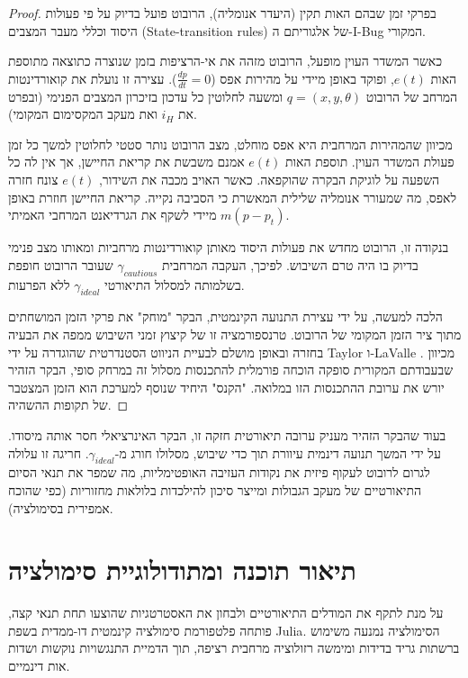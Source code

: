 \documentclass[12pt, a4paper]{article}
\begin{document}
\begin{proof}
בפרקי זמן שבהם האות תקין (היעדר אנומליה), הרובוט פועל בדיוק על פי פעולות היסוד וכללי מעבר המצבים (\textenglish{State-transition rules}) של אלגוריתם ה-\textenglish{I-Bug} המקורי.

כאשר המשדר העוין מופעל, הרובוט מזהה את אי-הרציפות בזמן שנוצרה כתוצאה מתוספת האות $e(t)$, ופוקד באופן מיידי על מהירות אפס ($\frac{dp}{dt} = 0$). עצירה זו נועלת את קואורדינטות המרחב של הרובוט $q = (x, y, \theta)$ ומשעה לחלוטין כל עדכון בזיכרון המצבים הפנימי (ובפרט את $i_H$ ואת מעקב המקסימום המקומי).

מכיוון שהמהירות המרחבית היא אפס מוחלט, מצב הרובוט נותר סטטי לחלוטין למשך כל זמן פעולת המשדר העוין. תוספת האות $e(t)$ אמנם משבשת את קריאת החיישן, אך אין לה כל השפעה על לוגיקת הבקרה שהוקפאה. כאשר האויב מכבה את השידור, $e(t)$ צונח חזרה לאפס, מה שמעורר אנומליה שלילית המאשרת כי הסביבה נקייה. קריאת החיישן חוזרת באופן מיידי לשקף את הגרדיאנט המרחבי האמיתי $m(p - p_t)$.

בנקודה זו, הרובוט מחדש את פעולות היסוד מאותן קואורדינטות מרחביות ומאותו מצב פנימי בדיוק בו היה טרם השיבוש. לפיכך, העקבה המרחבית $\gamma_{cautious}$ שעובר הרובוט חופפת בשלמותה למסלול התיאורטי $\gamma_{ideal}$ ללא הפרעות. 

הלכה למעשה, על ידי עצירת התנועה הקינמטית, הבקר "מוחק" את פרקי הזמן המושחתים מתוך ציר הזמן המקומי של הרובוט. טרנספורמציה זו של קיצוץ זמני השיבוש ממפה את הבעיה בחזרה ובאופן מושלם לבעיית הניווט הסטנדרטית שהוגדרה על ידי \textenglish{Taylor} ו-\textenglish{LaValle} \cite{taylor2014intensity}. מכיוון שבעבודתם המקורית סופקה הוכחה פורמלית להתכנסות מסלול זה במרחק סופי, הבקר הזהיר יורש את ערובת ההתכנסות הזו במלואה. "הקנס" היחיד שנוסף למערכת הוא הזמן המצטבר של תקופות ההשהיה.
\end{proof}

בעוד שהבקר הזהיר מעניק ערובה תיאורטית חזקה זו, הבקר האינרציאלי חסר אותה מיסודו. על ידי המשך תנועה דינמית עיוורת תוך כדי שיבוש, מסלולו חורג מ-$\gamma_{ideal}$. חריגה זו עלולה לגרום לרובוט לעקוף פיזית את נקודות העזיבה האופטימליות, מה שמפר את תנאי הסיום התיאורטיים של מעקב הגבולות ומייצר סיכון להילכדות בלולאות מחזוריות (כפי שהוכח אמפירית בסימולציה).

\section{תיאור תוכנה ומתודולוגיית סימולציה}
על מנת לתקף את המודלים התיאורטיים ולבחון את האסטרטגיות שהוצעו תחת תנאי קצה, פותחה פלטפורמת סימולציה קינמטית דו-ממדית בשפת \textenglish{Julia}. הסימולציה נמנעה משימוש ברשתות גריד בדידות ומימשה רזולוציה מרחבית רציפה, תוך הדמיית התנגשויות נוקשות ושדות אות דינמיים.
\end{document}
